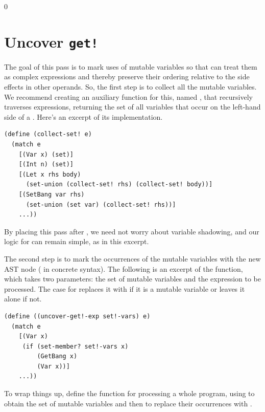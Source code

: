 \documentclass[7x10]{TimesAPriori_MIT}%
\def\racketEd{0}
\def\edition{0}
\numberwithin{theorem}{chapter}
\numberwithin{definition}{chapter}
\numberwithin{equation}{chapter}
\begin{document}
{\if\edition\racketEd
\section{Uncover \texttt{get!}}
\label{sec:uncover-get-bang}

The goal of this pass is to mark uses of mutable variables so that
 can treat them as complex expressions
and thereby preserve their ordering relative to the side effects in
other operands. So, the first step is to collect all the mutable
variables. We recommend creating an auxiliary function for this,
named , that recursively traverses expressions,
returning the set of all variables that occur on the left-hand side of a
. Here's an excerpt of its implementation.
\begin{center}
\begin{minipage}{\textwidth}
\begin{lstlisting}
(define (collect-set! e)
  (match e
    [(Var x) (set)]
    [(Int n) (set)]
    [(Let x rhs body)
      (set-union (collect-set! rhs) (collect-set! body))]
    [(SetBang var rhs)
      (set-union (set var) (collect-set! rhs))]
    ...))
\end{lstlisting}
\end{minipage}
\end{center}
By placing this pass after , we need not worry about
variable shadowing, and our logic for  can remain simple, as
in this excerpt.

The second step is to mark the occurrences of the mutable variables
with the new  AST node ( in concrete
syntax). The following is an excerpt of the 
function, which takes two parameters: the set of mutable variables
 and the expression  to be processed. The
case for  replaces it with  if it is a
mutable variable or leaves it alone if not.
\begin{center}
\begin{minipage}{\textwidth}
\begin{lstlisting}
(define ((uncover-get!-exp set!-vars) e)
  (match e
    [(Var x)
     (if (set-member? set!-vars x)
         (GetBang x)
         (Var x))]
    ...))
\end{lstlisting}
\end{minipage}
\end{center}

To wrap things up, define the  function for
processing a whole program, using  to obtain the
set of mutable variables and then  to replace
their occurrences with .


\fi}
\end{document}
